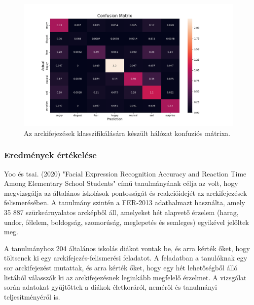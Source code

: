 \documentclass[12pt,a4]{article}
\begin{document}
            
                \begin{figure}[h!]	
            		\centering
            		\includegraphics[width=1\linewidth]{cf_matrix_normalized.png}
                    \caption{Az arckifejezések klasszifikálására készült hálózat konfuziós mátrixa.}
                    \label{fig:cfmatrix}
            	\end{figure}

            \newpage
        
        \subsubsection{Eredmények értékelése}
     
            \cite{facerecresult}Yoo és tsai. (2020) "Facial Expression Recognition Accuracy and Reaction Time Among Elementary School Students" című tanulmányának célja az volt, hogy megvizsgálja az általános iskolások pontosságát és reakcióidejét az arckifejezések felismerésében. A tanulmány szintén a FER-2013 adathalmazt használta, amely 35 887 szürkeárnyalatos arcképből áll, amelyeket hét alapvető érzelem (harag, undor, félelem, boldogság, szomorúság, meglepetés és semleges) egyikével jelöltek meg.
        
            A tanulmányhoz 204 általános iskolás diákot vontak be, és arra kérték őket, hogy töltsenek ki egy arckifejezés-felismerési feladatot. A feladatban a tanulóknak egy sor arckifejezést mutattak, és arra kérték őket, hogy egy hét lehetőségből álló listából válasszák ki az arckifejezésnek leginkább megfelelő érzelmet. A vizsgálat során adatokat gyűjtöttek a diákok életkoráról, neméről és tanulmányi teljesítményéről is.
    
\end{document}
